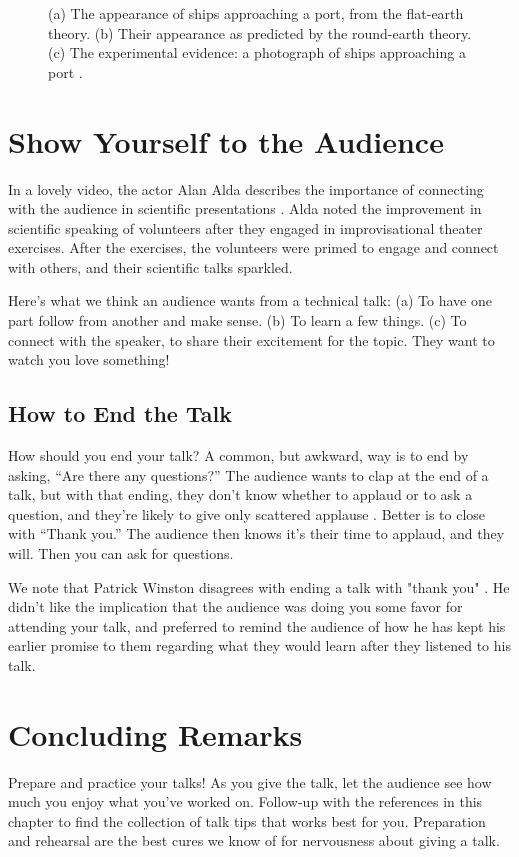 \begin{figure}[htpb!]
\centerline{
}
\caption{(a) The appearance of ships approaching a port, from the flat-earth theory.  (b) Their appearance as predicted by the round-earth theory.  (c) The experimental evidence:  a photograph of ships approaching a port \cite{mnsomero}. }
\label{fig:boats}
\end{figure}



\section{Show Yourself to the Audience}

In a lovely video, the actor Alan Alda describes the importance of  connecting with the audience in scientific presentations \cite{AlanAlda}.  Alda noted the improvement in scientific speaking of volunteers after they engaged in improvisational theater exercises.  After the exercises, the volunteers were primed to engage and connect with others, and their scientific talks sparkled.

Here's what we think an audience wants from a technical talk:
(a) To have one part follow from another and make sense.
(b) To learn a few things.
(c) To connect with the speaker, to share their excitement for the topic. They want to watch you love something!


\subsection{How to End the Talk}
How should you end your talk?  A common, but awkward, way is to end by asking, ``Are there any questions?''  The audience wants to clap at the end of a talk, but with that ending, they don't know whether to applaud or to ask a question, and they're likely to give only scattered applause \cite{Adelson95}.
Better is to close with ``Thank you.''  The audience then knows it's their time to applaud, and they will.  Then you can ask for questions.

We note that Patrick Winston disagrees with ending a talk with "thank you" \cite{WinstonSpeaks}.  He didn't like the implication that the audience was doing you some favor for attending your talk, and preferred to remind the audience of how he has kept his earlier promise to them regarding what they would learn after they listened to his talk.

\section{Concluding Remarks}
Prepare and practice your talks!  As you give the talk, let the audience see how much you enjoy what you've worked on.  Follow-up with the references in this chapter to find the collection of talk tips that works best for you.  Preparation and rehearsal are the best cures we know of for nervousness about giving a talk.


